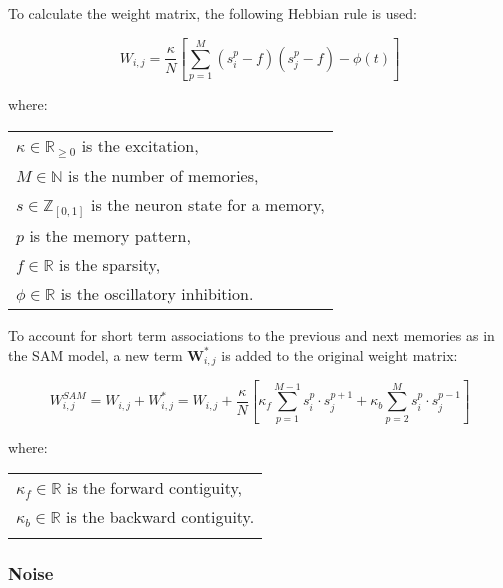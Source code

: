     To calculate the weight matrix, the following Hebbian rule is used:

        \begin{equation}
            W_{i,j} = \frac{\kappa}{N} \left[ \sum_{p=1}^{M} (s_{i}^{p} - f) (s_{j}^{p} - f) - \phi(t) \right]
        \label{eq:weights} \end{equation}

        where:

        \begin{tabular}{l} \\
            \(\kappa \in \mathbb{R}_{\geqslant 0}\) is the excitation, \\
            \(M \in \mathbb{N}\) is the number of memories, \\
            \(s \in \mathbb{Z}_{[0, 1]}\) is the neuron state for a memory, \\
            \(p\) is the memory pattern, \\
            \(f \in \mathbb{R}\) is the sparsity, \\
            \(\phi \in \mathbb{R}\) is the oscillatory inhibition.
        \label{tab:conditions_weights} \end{tabular} \bigskip


    To account for short term associations to the previous and next memories as in the SAM model, a new term \(\boldsymbol{W}_{i,j}^{*}\) is added to the original weight matrix:

        \begin{equation}
        W_{i, j}^{SAM} = W_{i, j} + W_{i, j}^{*} = W_{i, j} + \frac{\kappa}{N} \left[ \kappa_{f} \sum_{p=1}^{M-1} s_{i}^{p} \cdot s_{j}^{p+1} + \kappa_{b} \sum_{p=2}^{M} s_{i}^{p} \cdot s_{j}^{p-1} \right]
        \label{eq:weights_sam} \end{equation}

        where:

        \begin{tabular}{l} \\
            \(\kappa_{f} \in \mathbb{R}\) is the forward contiguity, \\
            \(\kappa_{b} \in \mathbb{R}\) is the backward contiguity. \\
        \label{tab:conditions_weights_sam} \end{tabular} \bigskip


\subsubsection{Noise}


